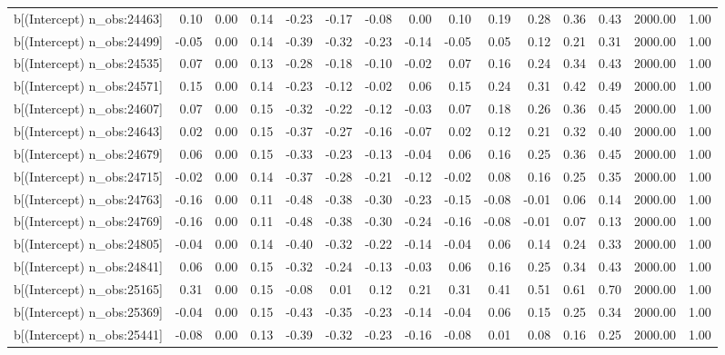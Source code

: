 \begin{table}[ht]
\begin{tabular}{rrrrrrrrrrrrrrr}
  b[(Intercept) n\_obs:24463] & 0.10 & 0.00 & 0.14 & -0.23 & -0.17 & -0.08 & 0.00 & 0.10 & 0.19 & 0.28 & 0.36 & 0.43 & 2000.00 & 1.00 \\ 
  b[(Intercept) n\_obs:24499] & -0.05 & 0.00 & 0.14 & -0.39 & -0.32 & -0.23 & -0.14 & -0.05 & 0.05 & 0.12 & 0.21 & 0.31 & 2000.00 & 1.00 \\ 
  b[(Intercept) n\_obs:24535] & 0.07 & 0.00 & 0.13 & -0.28 & -0.18 & -0.10 & -0.02 & 0.07 & 0.16 & 0.24 & 0.34 & 0.43 & 2000.00 & 1.00 \\ 
  b[(Intercept) n\_obs:24571] & 0.15 & 0.00 & 0.14 & -0.23 & -0.12 & -0.02 & 0.06 & 0.15 & 0.24 & 0.31 & 0.42 & 0.49 & 2000.00 & 1.00 \\ 
  b[(Intercept) n\_obs:24607] & 0.07 & 0.00 & 0.15 & -0.32 & -0.22 & -0.12 & -0.03 & 0.07 & 0.18 & 0.26 & 0.36 & 0.45 & 2000.00 & 1.00 \\ 
  b[(Intercept) n\_obs:24643] & 0.02 & 0.00 & 0.15 & -0.37 & -0.27 & -0.16 & -0.07 & 0.02 & 0.12 & 0.21 & 0.32 & 0.40 & 2000.00 & 1.00 \\ 
  b[(Intercept) n\_obs:24679] & 0.06 & 0.00 & 0.15 & -0.33 & -0.23 & -0.13 & -0.04 & 0.06 & 0.16 & 0.25 & 0.36 & 0.45 & 2000.00 & 1.00 \\ 
  b[(Intercept) n\_obs:24715] & -0.02 & 0.00 & 0.14 & -0.37 & -0.28 & -0.21 & -0.12 & -0.02 & 0.08 & 0.16 & 0.25 & 0.35 & 2000.00 & 1.00 \\ 
  b[(Intercept) n\_obs:24763] & -0.16 & 0.00 & 0.11 & -0.48 & -0.38 & -0.30 & -0.23 & -0.15 & -0.08 & -0.01 & 0.06 & 0.14 & 2000.00 & 1.00 \\ 
  b[(Intercept) n\_obs:24769] & -0.16 & 0.00 & 0.11 & -0.48 & -0.38 & -0.30 & -0.24 & -0.16 & -0.08 & -0.01 & 0.07 & 0.13 & 2000.00 & 1.00 \\ 
  b[(Intercept) n\_obs:24805] & -0.04 & 0.00 & 0.14 & -0.40 & -0.32 & -0.22 & -0.14 & -0.04 & 0.06 & 0.14 & 0.24 & 0.33 & 2000.00 & 1.00 \\ 
  b[(Intercept) n\_obs:24841] & 0.06 & 0.00 & 0.15 & -0.32 & -0.24 & -0.13 & -0.03 & 0.06 & 0.16 & 0.25 & 0.34 & 0.43 & 2000.00 & 1.00 \\ 
  b[(Intercept) n\_obs:25165] & 0.31 & 0.00 & 0.15 & -0.08 & 0.01 & 0.12 & 0.21 & 0.31 & 0.41 & 0.51 & 0.61 & 0.70 & 2000.00 & 1.00 \\ 
  b[(Intercept) n\_obs:25369] & -0.04 & 0.00 & 0.15 & -0.43 & -0.35 & -0.23 & -0.14 & -0.04 & 0.06 & 0.15 & 0.25 & 0.34 & 2000.00 & 1.00 \\ 
  b[(Intercept) n\_obs:25441] & -0.08 & 0.00 & 0.13 & -0.39 & -0.32 & -0.23 & -0.16 & -0.08 & 0.01 & 0.08 & 0.16 & 0.25 & 2000.00 & 1.00 \\ 

\end{tabular}
\end{table}
